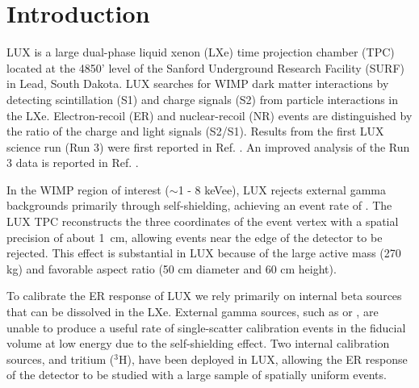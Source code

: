 \section{Introduction}

LUX is a large dual-phase liquid xenon (LXe) time projection chamber (TPC) located at the 4850' level of the Sanford Underground Research Facility (SURF) in Lead, South Dakota. LUX searches for WIMP dark matter interactions by detecting scintillation (S1) and charge signals (S2) from particle interactions in the LXe. Electron-recoil (ER) and nuclear-recoil (NR) events are distinguished by the ratio of the charge and light signals (S2/S1). Results from the first LUX science run (Run 3) were first reported in Ref. \cite{LUX_PRL}. An improved analysis of the Run 3 data is reported in Ref. \cite{lux-reanalysis}.

In the WIMP region of interest ($\sim$1 - 8 keVee), LUX rejects external gamma backgrounds primarily through self-shielding, achieving an event rate of .  The LUX TPC reconstructs the three coordinates of the event vertex with a spatial precision of about 1~cm,  allowing events near the edge of the detector to be rejected. This effect is substantial in LUX because of the large active mass (270 kg) and favorable aspect ratio (50 cm diameter and 60 cm height). 

To calibrate the ER response of LUX we rely primarily on internal beta sources that can be dissolved in the LXe. External gamma sources, such as \cssrc or \thsrc, are unable to produce a useful rate of single-scatter calibration events in the fiducial volume at low energy due to the self-shielding effect. Two internal calibration sources,  \krsrc\cite{Kastens:2009rt, baudis} and tritium ($^{3}$H), have been deployed in LUX, allowing the ER response of the detector to be studied with a large sample of spatially uniform events.


